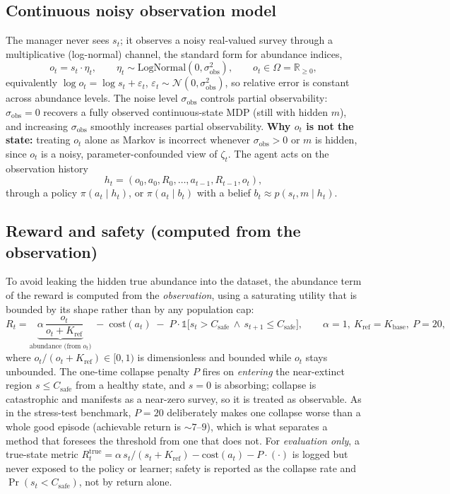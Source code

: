 \documentclass[11pt]{article}
\newcommand{\Kbase}{K_{\mathrm{base}}}
\newcommand{\Kref}{K_{\mathrm{ref}}}
\newcommand{\sobs}{\sigma_{\mathrm{obs}}}
\newcommand{\Csafe}{C_{\mathrm{safe}}}
\begin{document}
\subsection{Continuous noisy observation model}
The manager never sees $s_t$; it observes a noisy real-valued survey through a
multiplicative (log-normal) channel, the standard form for abundance indices,
\begin{equation}
o_t = s_t \cdot \eta_t, \qquad \eta_t \sim \mathrm{LogNormal}(0,\sobs^2),
\qquad o_t \in \Omega = \mathbb{R}_{\ge 0},
\label{eq:obs}
\end{equation}
equivalently $\log o_t = \log s_t + \varepsilon_t$, $\varepsilon_t\sim
\mathcal{N}(0,\sobs^2)$, so relative error is constant across abundance levels.
The noise level $\sobs$ controls partial observability: $\sobs{=}0$ recovers a
fully observed continuous-state MDP (still with hidden $m$), and increasing
$\sobs$ smoothly increases partial observability. \textbf{Why $o_t$ is not the
state:} treating $o_t$ alone as Markov is incorrect whenever $\sobs>0$ or $m$ is
hidden, since $o_t$ is a noisy, parameter-confounded view of $\zeta_t$. The agent
acts on the observation history
\begin{equation}
h_t = (o_0, a_0, R_0, \dots, a_{t-1}, R_{t-1}, o_t),
\end{equation}
through a policy $\pi(a_t\mid h_t)$, or $\pi(a_t\mid b_t)$ with a belief
$b_t \approx p(s_t, m \mid h_t)$.

\subsection{Reward and safety (computed from the observation)}
To avoid leaking the hidden true abundance into the dataset, the abundance term of
the reward is computed from the \emph{observation}, using a saturating utility
that is bounded by its shape rather than by any population cap:
\begin{equation}
R_t = \underbrace{\alpha\,\frac{o_t}{o_t + \Kref}}_{\text{abundance (from }o_t\text{)}}
\;-\; \mathrm{cost}(a_t)
\;-\; P\cdot\mathbb{1}\big[s_t > \Csafe \,\wedge\, s_{t+1}\le \Csafe\big],
\qquad \alpha=1,\ \Kref=\Kbase,\ P=20,
\label{eq:reward}
\end{equation}
where $o_t/(o_t+\Kref)\in[0,1)$ is dimensionless and bounded while $o_t$ stays
unbounded. The one-time collapse penalty $P$ fires on \emph{entering} the
near-extinct region $s\le\Csafe$ from a healthy state, and $s{=}0$ is absorbing;
collapse is catastrophic and manifests as a near-zero survey, so it is treated as
observable. As in the stress-test benchmark, $P{=}20$ deliberately makes one
collapse worse than a whole good episode (achievable return is $\sim 7$--$9$),
which is what separates a method that foresees the threshold from one that does
not. For \emph{evaluation only}, a true-state metric
$R^{\mathrm{true}}_t = \alpha\, s_t/(s_t+\Kref) - \mathrm{cost}(a_t) - P\cdot(\cdot)$
is logged but never exposed to the policy or learner; safety is reported as the
collapse rate and $\Pr(s_t<\Csafe)$, not by return alone.
\end{document}

